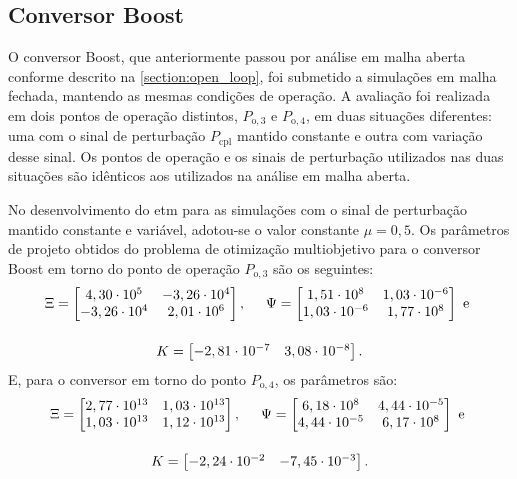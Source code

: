 \subsection{Conversor Boost}

O conversor Boost, que anteriormente passou por análise em malha aberta conforme descrito na \autoref{section:open_loop}, foi submetido a simulações em malha fechada, mantendo as mesmas condições de operação. A avaliação foi realizada em dois pontos de operação distintos, $P_{\mathrm{o}, 3}$ e $P_{\mathrm{o}, 4}$, em duas situações diferentes: uma com o sinal de perturbação $P_{\mathrm{cpl}}$ mantido constante e outra com variação desse sinal. Os pontos de operação e os sinais de perturbação utilizados nas duas situações são idênticos aos utilizados na análise em malha aberta.

No desenvolvimento do \acrshort{etm} para as simulações com o sinal de perturbação mantido constante e variável, adotou-se o valor constante $\mu = 0,5$. Os parâmetros de projeto obtidos do problema de otimização multiobjetivo para o conversor Boost em torno do ponto de operação $P_{\mathrm{o}, 3}$ são os seguintes: \begin{gather}
  \Xi = \begin{bmatrix}
    4,30 \cdot 10^5  & -3,26 \cdot 10^4 \\
    -3,26 \cdot 10^4 & 2,01 \cdot 10^6  \\
  \end{bmatrix}, \hspace{.5cm}
  \Psi = \begin{bmatrix}
    1,51 \cdot 10^8    & 1,03 \cdot 10^{-6} \\
    1,03 \cdot 10^{-6} & 1,77 \cdot 10^8    \\
  \end{bmatrix} \text{ e } \notag \\[12pt]
  K = \begin{bmatrix}
    -2,81 \cdot 10^{-7} & 3,08 \cdot 10^{-8}
  \end{bmatrix} . \notag
\end{gather} E, para o conversor em torno do ponto $P_{\mathrm{o}, 4}$, os parâmetros são: \begin{gather}
  \Xi = \begin{bmatrix}
    2,77\cdot 10^{13} & 1,03\cdot 10^{13} \\
    1,03\cdot 10^{13} & 1,12\cdot 10^{13} \\
  \end{bmatrix}, \hspace{.5cm}
  \Psi = \begin{bmatrix}
    6,18\cdot 10^{8}  & 4,44\cdot 10^{-5} \\
    4,44\cdot 10^{-5} & 6,17\cdot 10^{8}  \\
  \end{bmatrix} \text{ e } \notag \\[12pt]
  K = \begin{bmatrix}
    -2,24 \cdot 10^{-2} & -7,45\cdot 10^{-3}
  \end{bmatrix} . \notag
\end{gather}

